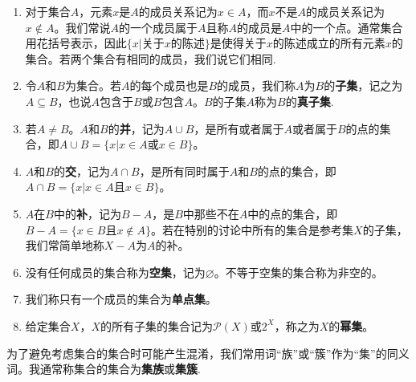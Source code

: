 \documentclass[lang=cn,newtx,10pt,scheme=chinese]{elegantbook}
\begin{document}
\begin{definition}[集合的基本概念]\label{definition:集合的基本概念}
\begin{enumerate}
  \item 对于集合\(A\)，元素\(x\)是\(A\)的成员关系记为\(x\in A\)，而\(x\)不是\(A\)的成员关系记为\(x\notin A\)。我们常说\(A\)的一个成员属于\(A\)且称\(A\)的成员是\(A\)中的一个点。通常集合用花括号表示，因此\(\{x|关于x的陈述\}\)是使得关于\(x\)的陈述成立的所有元素\(x\)的集合。若两个集合有相同的成员，我们说它们相同.

  \item 令\(A\)和\(B\)为集合。若\(A\)的每个成员也是\(B\)的成员，我们称\(A\)为\(B\)的\textbf{子集}，记之为\(A\subseteq B\)，也说\(A\)包含于\(B\)或\(B\)包含\(A\)。\(B\)的子集\(A\)称为\(B\)的\textbf{真子集}.

  \item 若\(A\neq B\)。\(A\)和\(B\)的\textbf{并}，记为\(A\cup B\)，是所有或者属于\(A\)或者属于\(B\)的点的集合，即\(A\cup B = \{x|x\in A或x\in B\}\)。

  \item \(A\)和\(B\)的\textbf{交}，记为\(A\cap B\)，是所有同时属于\(A\)和\(B\)的点的集合，即\(A\cap B = \{x|x\in A且x\in B\}\)。

  \item \(A\)在\(B\)中的\textbf{补}，记为\(B - A\)，是\(B\)中那些不在\(A\)中的点的集合，即\(B - A=\{x\in B且x\notin A\}\)。若在特别的讨论中所有的集合是参考集\(X\)的子集，我们常简单地称\(X - A\)为\(A\)的补。

  \item 没有任何成员的集合称为\textbf{空集}，记为\(\varnothing\)。不等于空集的集合称为非空的。

  \item 我们称只有一个成员的集合为\textbf{单点集}。

  \item 给定集合\(X\)，\(X\)的所有子集的集合记为\(\mathcal{P}(X)\)或\(2^X\)，称之为\(X\)的\textbf{幂集}。
\end{enumerate}
\end{definition}
\begin{remark}
  为了避免考虑集合的集合时可能产生混淆，我们常用词“族”或“簇”作为“集”的同义词。我通常称集合的集合为\textbf{集族}或\textbf{集簇}.
\end{remark}
\end{document}

